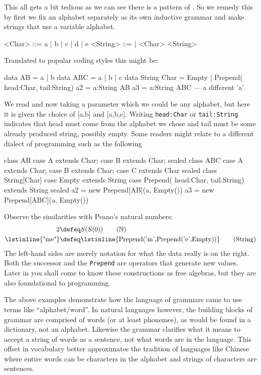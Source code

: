 This all gets a bit tedious as we can see there is a pattern of
.  So we remedy this by first we fix an alphabet
separately as its own inductive grammar and make strings that use a variable alphabet.
\begin{Gcode}[]
<Char> ::= a | b | c | d | e
<String> ::= 
           | <Char> <String>
\end{Gcode}
Translated to popular coding styles this might be:
\begin{Fcode}[]
data AB = a | b
data ABC = a | b | c 
data String Char = Empty 
            | Prepend( head:Char, tail:String) 
a2 = a:String AB
a3 = a:String ABC --- a different 'a'
\end{Fcode}
We read  and now taking a parameter 
which we could be any alphabet, but here it is given the 
choice of [a,b] and [a,b,c].
Writing \lstinline{head:Char} or \lstinline{tail:String} 
indicates that head must come from the alphabet we chose 
and tail must be some already produced string, possibly empty.
Some readers might relate to a different dialect of 
programming such as the following
\begin{Pcode}[]
class AB
  case A extends Char;  case B extends Char;
sealed
class ABC
  case A extends Char;  case B extends Char;
  case C extends Char
sealed
class String[Char]
  case Empty extends String
  case Prepend( head:Char, tail:String) extends String
sealed
a2 = new Prepend[AB](a, Empty())
a3 = new Prepend[ABC](a, Empty())
\end{Pcode}
Observe the similarities with Peano's natural numbers:
\begin{align}
     2 & \defeq S(S(0)) \tag{$\mathbb{N}$}\\
 \text{\lstinline{"me"}} & \defeq \text{\lstinline{Prepend('m',Prepend('e',Empty))}}
\tag{String}
\end{align}
The left-hand sides are merely notation for what the data really is on the right.
Both the successor and the \lstinline{Prepend} are operators that generate 
new values.  Later in you shall come to know these constructions as free algebras,
but they are also foundational to programming.



\begin{remark}
    The above examples demonstrate how the language of grammars came to 
    use terms like ``alphabet/word''. 
    In natural languages however, the building blocks of grammar are comprised of words (or
    at least phonemes), as would be found in a dictionary, not an alphabet.  
    Likewise the grammar clarifies what it means to accept a string of words as a sentence,
    not what words are in the language. This offset in vocabulary better 
    approximates the tradition of languages like Chinese
    where entire words can be characters in the alphabet and strings of
    characters are sentences.
\end{remark}
